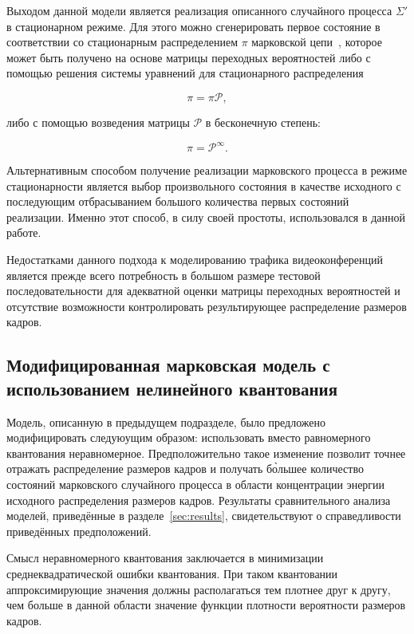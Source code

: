 Выходом данной модели является реализация описанного случайного процесса $\Sigma'$
в стационарном режиме. Для этого можно сгенерировать первое состояние
в соответствии со стационарным распределением $\pi$ марковской цепи~\cite{markovchains},
которое может быть получено на основе матрицы переходных вероятностей
либо с помощью решения системы уравнений для стационарного распределения

\begin{equation}
    \pi = \pi \mathcal{P},
\end{equation}

либо с помощью возведения матрицы $\mathcal{P}$ в бесконечную степень:

\begin{equation}
    \pi = \mathcal{P}^\infty.
\end{equation}

Альтернативным способом получение реализации марковского процесса
в режиме стационарности является выбор произвольного состояния
в качестве исходного с последующим отбрасыванием большого количества
первых состояний реализации. Именно этот способ, в силу своей простоты,
использовался в данной работе.

Недостатками данного подхода к моделированию трафика видеоконференций
является прежде всего потребность в большом размере тестовой последовательности
для адекватной оценки матрицы переходных вероятностей и отсутствие
возможности контролировать результирующее распределение размеров
кадров.

\subsection{Модифицированная марковская модель с использованием
нелинейного квантования}
\label{sse:markkmeans}

Модель, описанную в предыдущем подразделе, было предложено модифицировать
следуюущим образом: использовать вместо равномерного квантования
неравномерное. Предположительно такое изменение позволит точнее
отражать распределение размеров кадров и получать б\`{о}льшее количество
состояний марковского случайного процесса в области концентрации
энергии исходного распределения размеров кадров. Результаты
сравнительного анализа моделей, приведённые в разделе~\ref{sec:results},
свидетельствуют о справедливости приведённых предположений.

Смысл неравномерного квантования заключается в минимизации
среднеквадратической ошибки квантования. При таком квантовании
аппроксимирующие значения должны располагаться тем плотнее
друг к другу, чем больше в данной области значение функции
плотности вероятности размеров кадров.

